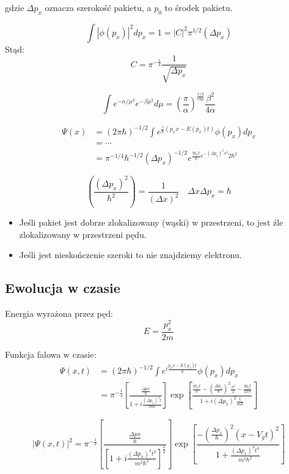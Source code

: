 gdzie $\Delta p_x$ oznacza szerokość pakietu, a $p_0$ to środek pakietu.

\[
\int |\phi(p_x)|^2 dp_x = 1 = |C|^2 \pi^{1/2} (\Delta p_x)
\]
Stąd:
\[
C = \pi^{-\frac{1}{4}} \frac{1}{\sqrt{\Delta p_x}}
\]

\[
\int e^{-\alpha/\mu^2} e^{-\beta \mu^2} d\mu = \left(\frac{\pi}{\alpha}\right)^\frac{1/2} \exp{\frac{\beta^2}{4\alpha}}
\]

\begin{align*}
\Psi(x) &= (2\pi\hbar)^{-1/2} \int e^{\frac{i}{\hbar} (p_x x - E(p_x) t)} \phi(p_x) dp_x \\
&= \cdots \\
&= \pi^{-1/4} \hbar^{-1/2} (\Delta p_x)^{-1/2} e^{\frac{ip_0 x}{\hbar} e^{-(\Delta p_x)^2 x^2}{2\hbar^2}}
\end{align*}

\[
(\frac{(\Delta p_x)^2}{\hbar^2}) = \frac{1}{(\Delta x)^2} \quad \Delta x \Delta p_x = \hbar
\]
\begin{itemize}
    \item Jeśli pakiet jest dobrze zlokalizowany (wąski) w przestrzeni, to jest źle zlokalizowany w przestrzeni pędu.
    \item Jeśli jest nieskończenie szeroki to nie znajdziemy elektronu.
\end{itemize}

\subsection{Ewolucja w czasie}

Energia wyrażona przez pęd:
\[
E = \frac{p_x^2}{2m}
\]

Funkcja falowa w czasie:
\begin{align*}
\Psi(x,t) &= \left(2\pi\hbar \right)^{-1/2} \int e^{i\frac{p_x x - E(p_x)t}{\hbar}} \phi(p_x) dp_x \\
&= \pi^{-\frac{1}{4}}\left[\frac{\frac{\Delta p x}{\hbar}}{1+i\frac{(\Delta p_x)^2 t}{m\hbar}}\right] \exp\left[\frac{\frac{ip_0 x}{\hbar}-\left(\frac{\Delta p_x}{\hbar}\right)^2\frac{x^2}{2}-\frac{ip_0 t}{2x\hbar}}{1+i(\Delta p_x)^2 \frac{t}{m\hbar}}\right]
\end{align*}

\[
|\Psi(x,t)|^2 = \pi^{-\frac{1}{2}}\left[\frac{\frac{\Delta p x}{\hbar}}{\left[1+i\frac{(\Delta p_x)^4 t^2}{m^2\hbar^2}\right]^{\frac{1}{2}}}\right] \exp\left[\frac{-\left(\frac{\Delta p_x}{\hbar}\right)^2(x-V_gt)^2}{1+\frac{(\Delta p_x)^4 t^4}{m^2\hbar^2}}\right]
\]

